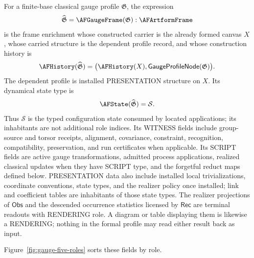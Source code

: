 \begin{definition}
\label{def:artform-gauge-frame}
For a finite-base classical gauge profile $\mathfrak G$, the expression
\[
 \widehat{\mathfrak G}=\AFGaugeFrame(\mathfrak G):\AFArtformFrame
\]
is the frame enrichment whose constructed carrier is the already formed canvas
$X$, whose carried structure is the dependent profile record, and whose
construction history is
\[
 \AFHistory(\widehat{\mathfrak G})
 =\bigl(\AFHistory(X),
        \mathsf{GaugeProfileNode}(\mathfrak G)\bigr).
\]
The dependent profile is installed PRESENTATION structure on $X$.  Its
dynamical state type is
\[
 \AFState(\widehat{\mathfrak G})=\mathcal S.
\]
Thus $\mathcal S$ is the typed configuration state consumed by located
applications; its inhabitants are not additional role indices.  Its WITNESS
fields include group-source and torsor receipts, alignment, covariance,
constraint, recognition, compatibility, preservation, and run certificates
when applicable.
Its SCRIPT fields are active gauge transformations, admitted process
applications, realized classical updates when they have SCRIPT type, and the
forgetful reduct maps defined below.  PRESENTATION data
also include installed local trivializations, coordinate conventions, state
types, and the realizer policy once installed; link and coefficient tables are
inhabitants of those state types.  The realizer projections of
$\mathsf{Obs}$ and the
descended occurrence statistics licensed by $\mathsf{Rec}$ are terminal
readouts with RENDERING role.  A diagram or table displaying them is likewise
a RENDERING; nothing in the formal profile may read either result back as
input.
\end{definition}

Figure~\ref{fig:gauge-five-roles} sorts these fields by role.

